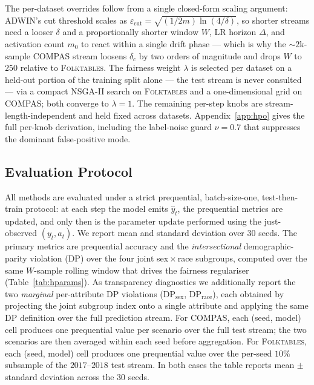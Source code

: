 \documentclass[sigconf,anonymous,review]{acmart}
\begin{document}
The per-dataset overrides follow from a single closed-form scaling argument: ADWIN's cut threshold scales as $\varepsilon_{\mathrm{cut}} = \sqrt{(1/2m)\ln(4/\delta)}$, so
shorter streams need a looser $\delta$ and a proportionally shorter window $W$, LR horizon $\Delta$, and activation count $m_0$ to react within a single drift phase --- which
is why the $\sim$$2$k-sample \textsc{COMPAS} stream loosens $\delta_c$ by two orders of magnitude and drops $W$ to $250$ relative to \textsc{Folktables}. The fairness weight
$\lambda$ is selected per dataset on a held-out portion of the training split alone --- the test stream is never consulted --- via a compact NSGA-II search on
\textsc{Folktables} and a one-dimensional grid on \textsc{COMPAS}; both converge to $\lambda=1$. The remaining per-step knobs are stream-length-independent and held fixed
across datasets. Appendix~\ref{app:hpo} gives the full per-knob derivation, including the label-noise guard $\nu=0.7$ that suppresses the dominant false-positive mode.

\subsection{Evaluation Protocol}
\label{sec:method:protocol}
All methods are evaluated under a strict prequential, batch-size-one, test-then-train protocol: at each step the model emits $\hat{y}_t$, the prequential metrics
are updated, and only then is the parameter update performed using the just-observed $(y_t, a_t)$. We report mean and standard deviation over $30$ seeds.
The primary metrics are prequential accuracy and the \emph{intersectional} demographic-parity violation (DP) over the four joint sex\,$\times$\,race subgroups,
computed over the same $W$-sample rolling window that drives the fairness regulariser (Table~\ref{tab:hparams}). As transparency diagnostics we additionally report
the two \emph{marginal} per-attribute DP violations ($\mathrm{DP}_{\text{sex}}$, $\mathrm{DP}_{\text{race}}$), each obtained by projecting the joint subgroup index onto
a single attribute and applying the same DP definition over the full prediction stream. For \textsc{COMPAS}, each (seed, model) cell produces one prequential value per
scenario over the full test stream; the two scenarios are then averaged within each seed before aggregation. For \textsc{Folktables}, each (seed, model) cell produces
one prequential value over the per-seed $10\%$ subsample of the $2017$--$2018$ test stream. In both cases the table reports mean $\pm$ standard deviation across the $30$
seeds.
\end{document}
